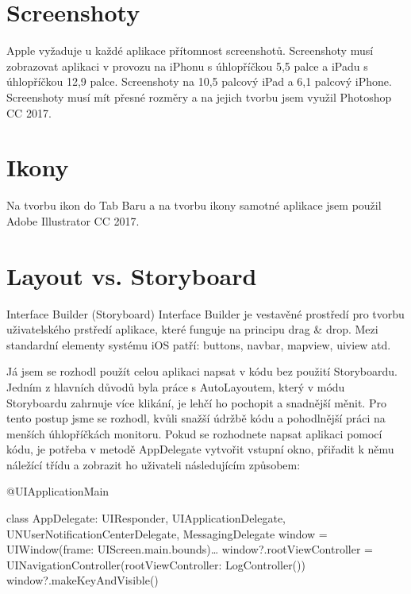 \documentclass{article}
\begin{document}
\vspace{10 mm}
\section{Screenshoty}
Apple vyžaduje u každé aplikace přítomnost screenshotů. Screenshoty musí zobrazovat aplikaci v provozu na iPhonu s úhlopříčkou 5,5 palce a iPadu s úhlopříčkou 12,9 palce. Screenshoty na 10,5 palcový iPad a 6,1 palcový iPhone. Screenshoty musí mít přesné rozměry a na jejich tvorbu jsem využil Photoshop CC 2017.

\vspace{10 mm}

\section{Ikony}

Na tvorbu ikon do Tab Baru a na tvorbu ikony samotné aplikace jsem použil Adobe Illustrator CC 2017. 
\vspace{10 mm}
        
\section{Layout vs. Storyboard}

Interface Builder (Storyboard)
Interface Builder je vestavěné prostředí pro tvorbu uživatelského prstředí aplikace, které funguje na principu drag & drop. Mezi standardní elementy systému iOS patří: buttons, navbar, mapview, uiview atd.
\vspace{10 mm}

Já jsem se rozhodl použít celou aplikaci napsat v kódu bez použití Storyboardu. 
Jedním z hlavních důvodů byla práce s AutoLayoutem, který v módu Storyboardu zahrnuje více klikání, je lehčí ho pochopit a snadnější měnit. 
Pro tento postup jsme se rozhodl, kvůli snažší údržbě kódu a pohodlnější práci na menších úhlopříčkách monitoru. Pokud se rozhodnete napsat aplikaci pomocí kódu, je potřeba v metodě AppDelegate vytvořit vstupní okno, přiřadit k němu náležící třídu a zobrazit ho uživateli následujícím způsobem:
\vspace{10 mm}

@UIApplicationMain

class AppDelegate: UIResponder, UIApplicationDelegate, UNUserNotificationCenterDelegate, MessagingDelegate {
  window = UIWindow(frame: UIScreen.main.bounds)…
  window?.rootViewController = UINavigationController(rootViewController: LogController())
    window?.makeKeyAndVisible()
}
    
\end{document}
